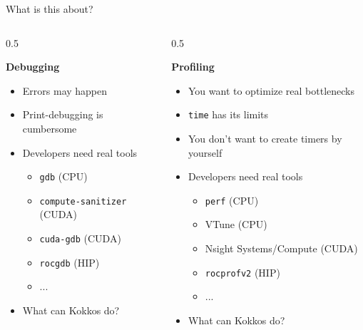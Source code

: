 \documentclass[
    aspectratio=169,
    \createHandout
]{beamer}
\begin{document}
\begin{frame}{What is this about?}
    \begin{columns}[T]
        \begin{column}{0.5\linewidth}
            \begin{center}
                \textbf{Debugging}
            \end{center}
            \begin{itemize}
                \item Errors may happen
                \item Print-debugging is cumbersome
                \item Developers need real tools
                \begin{itemize}
                    \item \texttt{gdb} (CPU)
                    \item \texttt{compute-sanitizer} (CUDA)
                    \item \texttt{cuda-gdb} (CUDA)
                    \item \texttt{rocgdb} (HIP)
                    \item ...
                \end{itemize}
                \item What can Kokkos do?
            \end{itemize}
        \end{column}
        \pause
        \begin{column}{0.5\linewidth}
            \begin{center}
                \textbf{Profiling}
            \end{center}
            \begin{itemize}
                \item You want to optimize real bottlenecks
                \item \texttt{time} has its limits
                \item You don't want to create timers by yourself
                \item Developers need real tools
                \begin{itemize}
                    \item \texttt{perf} (CPU)
                    \item VTune (CPU)
                    \item Nsight Systems/Compute (CUDA)
                    \item \texttt{rocprofv2} (HIP)
                    \item ...
                \end{itemize}
                \item What can Kokkos do?
            \end{itemize}
        \end{column}
    \end{columns}
\end{frame}
\end{document}
